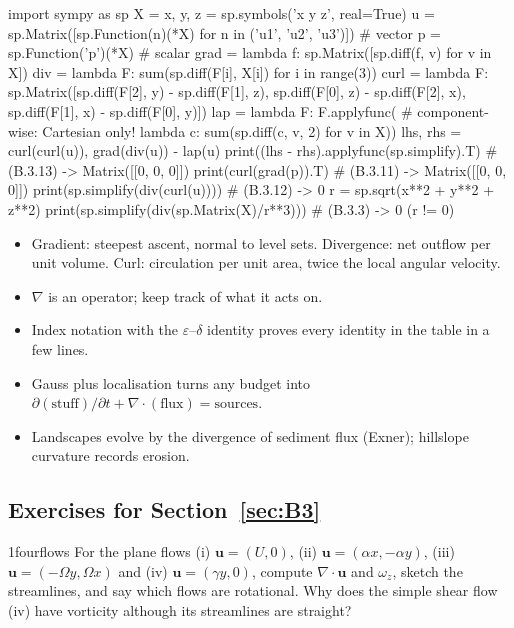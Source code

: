 \documentclass[11pt,letterpaper]{article}
\numberwithin{equation}{section}
\newcommand{\uu}{\mathbf{u}}
\begin{document}
\begin{pycode}
import sympy as sp
X = x, y, z = sp.symbols('x y z', real=True)
u = sp.Matrix([sp.Function(n)(*X) for n in ('u1', 'u2', 'u3')])  # vector
p = sp.Function('p')(*X)                                          # scalar
grad = lambda f: sp.Matrix([sp.diff(f, v) for v in X])
div  = lambda F: sum(sp.diff(F[i], X[i]) for i in range(3))
curl = lambda F: sp.Matrix([sp.diff(F[2], y) - sp.diff(F[1], z),
                            sp.diff(F[0], z) - sp.diff(F[2], x),
                            sp.diff(F[1], x) - sp.diff(F[0], y)])
lap = lambda F: F.applyfunc(          # component-wise: Cartesian only!
    lambda c: sum(sp.diff(c, v, 2) for v in X))
lhs, rhs = curl(curl(u)), grad(div(u)) - lap(u)
print((lhs - rhs).applyfunc(sp.simplify).T)   # (B.3.13) -> Matrix([[0, 0, 0]])
print(curl(grad(p)).T)                        # (B.3.11) -> Matrix([[0, 0, 0]])
print(sp.simplify(div(curl(u))))              # (B.3.12) -> 0
r = sp.sqrt(x**2 + y**2 + z**2)
print(sp.simplify(div(sp.Matrix(X)/r**3)))    # (B.3.3)  -> 0  (r != 0)
\end{pycode}

\begin{remember}
\begin{itemize}
  \item Gradient: steepest ascent, normal to level sets. Divergence: net outflow per unit volume. Curl: circulation per
        unit area, twice the local angular velocity.
  \item $\nabla$ is an operator; keep track of what it acts on.
  \item Index notation with the $\varepsilon$--$\delta$ identity proves every identity in the table in a few lines.
  \item Gauss plus localisation turns any budget into $\partial(\text{stuff})/\partial t+\nabla\cdot(\text{flux})=\text{sources}$.
  \item Landscapes evolve by the divergence of sediment flux (Exner); hillslope curvature records erosion.
\end{itemize}
\end{remember}

\subsection*{Exercises for Section~\ref{sec:B3}}

\begin{exercise}{1}{fourflows}
For the plane flows (i) $\uu=(U,0)$, (ii) $\uu=(\alpha x,-\alpha y)$, (iii) $\uu=(-\Omega y,\Omega x)$ and
(iv) $\uu=(\gamma y,0)$, compute $\nabla\cdot\uu$ and $\omega_z$, sketch the streamlines, and say which flows are
rotational. Why does the simple shear flow (iv) have vorticity although its streamlines are straight?
\end{exercise}
\end{document}
